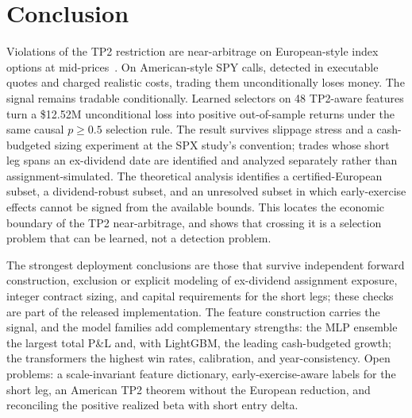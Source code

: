 \documentclass[sigconf,review,anonymous]{acmart}
\begin{document}
\section{Conclusion}
Violations of the TP2 restriction are near-arbitrage on European-style index options at mid-prices~\cite{glasserman2025tp2,glasserman2026tp2theory}. On American-style SPY calls, detected in executable quotes and charged realistic costs, trading them unconditionally loses money. The signal remains tradable conditionally. Learned selectors on 48 TP2-aware features turn a \$12.52M unconditional loss into positive out-of-sample returns under the same causal $p\ge0.5$ selection rule. The result survives slippage stress and a cash-budgeted sizing experiment at the SPX study's convention; trades whose short leg spans an ex-dividend date are identified and analyzed separately rather than assignment-simulated. The theoretical analysis identifies a certified-European subset, a dividend-robust subset, and an unresolved subset in which early-exercise effects cannot be signed from the available bounds. This locates the economic boundary of the TP2 near-arbitrage, and shows that crossing it is a selection problem that can be learned, not a detection problem.

The strongest deployment conclusions are those that survive independent forward construction, exclusion or explicit modeling of ex-dividend assignment exposure, integer contract sizing, and capital requirements for the short legs; these checks are part of the released implementation. The feature construction carries the signal, and the model families add complementary strengths: the MLP ensemble the largest total P\&L and, with LightGBM, the leading cash-budgeted growth; the transformers the highest win rates, calibration, and year-consistency. Open problems: a scale-invariant feature dictionary, early-exercise-aware labels for the short leg, an American TP2 theorem without the European reduction, and reconciling the positive realized beta with short entry delta.
\end{document}
